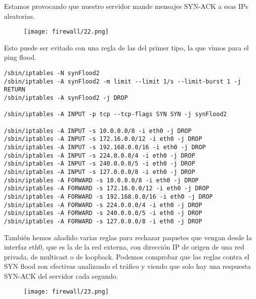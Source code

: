 Estamos provocando que nuestro servidor mande mensajes SYN-ACK a esas IPs aleatorias.

\begin{figure}[H]
    \centering
    \texttt{[image: firewall/22.png]}
\end{figure}

\newpage

Esto puede ser evitado con una regla de las del primer tipo, la que vimos para el ping flood.

\begin{lstlisting}
/sbin/iptables -N synFlood2
/sbin/iptables -A synFlood2 -m limit --limit 1/s --limit-burst 1 -j RETURN
/sbin/iptables -A synFlood2 -j DROP

/sbin/iptables -A INPUT -p tcp --tcp-flags SYN SYN -j synFlood2

/sbin/iptables -A INPUT -s 10.0.0.0/8 -i eth0 -j DROP
/sbin/iptables -A INPUT -s 172.16.0.0/12 -i eth0 -j DROP
/sbin/iptables -A INPUT -s 192.168.0.0/16 -i eth0 -j DROP
/sbin/iptables -A INPUT -s 224.0.0.0/4 -i eth0 -j DROP
/sbin/iptables -A INPUT -s 240.0.0.0/5 -i eth0 -j DROP
/sbin/iptables -A INPUT -s 127.0.0.0/8 -i eth0 -j DROP
/sbin/iptables -A FORWARD -s 10.0.0.0/8 -i eth0 -j DROP
/sbin/iptables -A FORWARD -s 172.16.0.0/12 -i eth0 -j DROP
/sbin/iptables -A FORWARD -s 192.168.0.0/16 -i eth0 -j DROP
/sbin/iptables -A FORWARD -s 224.0.0.0/4 -i eth0 -j DROP
/sbin/iptables -A FORWARD -s 240.0.0.0/5 -i eth0 -j DROP
/sbin/iptables -A FORWARD -s 127.0.0.0/8 -i eth0 -j DROP

\end{lstlisting}

También hemos añadido varias reglas para rechazar paquetes que vengan desde la interfaz eth0, que es la de la red externa, con dirección IP de origen de una red privada, de multicast o de loopback. Podemos comprobar que las reglas contra el SYN flood son efectivas analizando el tráfico y viendo que solo hay una respuesta SYN-ACK del servidor cada segundo.

\begin{figure}[H]
    \centering
    \texttt{[image: firewall/23.png]}
\end{figure}



